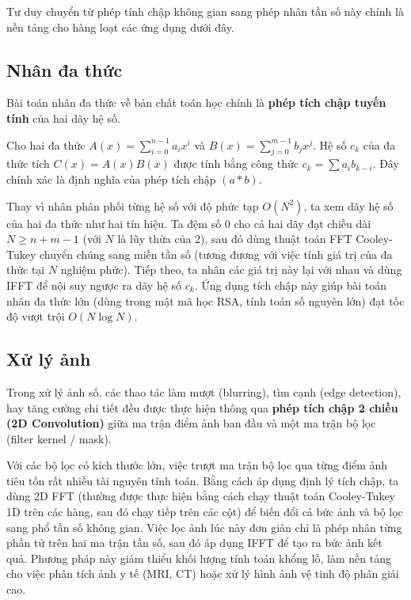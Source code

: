 Tư duy chuyển từ phép tính chập không gian sang phép nhân tần số này chính là nền tảng cho hàng loạt các ứng dụng dưới đây.

\subsection{Nhân đa thức}

Bài toán nhân đa thức về bản chất toán học chính là \textbf{phép tích chập tuyến tính} của hai dãy hệ số. 

Cho hai đa thức $A(x) = \sum_{i=0}^{n-1} a_i x^i$ và $B(x) = \sum_{j=0}^{m-1} b_j x^j$. Hệ số $c_k$ của đa thức tích $C(x) = A(x)B(x)$ được tính bằng công thức $c_k = \sum a_i b_{k-i}$. Đây chính xác là định nghĩa của phép tích chập $(a * b)$.

Thay vì nhân phân phối từng hệ số với độ phức tạp $O(N^2)$, ta xem dãy hệ số của hai đa thức như hai tín hiệu. Ta đệm số 0 cho cả hai dãy đạt chiều dài $N \ge n+m-1$ (với $N$ là lũy thừa của 2), sau đó dùng thuật toán FFT Cooley-Tukey chuyển chúng sang miền tần số (tương đương với việc tính giá trị của đa thức tại $N$ nghiệm phức). Tiếp theo, ta nhân các giá trị này lại với nhau và dùng IFFT để nội suy ngược ra dãy hệ số $c_k$. Ứng dụng tích chập này giúp bài toán nhân đa thức lớn (dùng trong mật mã học RSA, tính toán số nguyên lớn) đạt tốc độ vượt trội $O(N \log N)$.

\subsection{Xử lý ảnh}

Trong xử lý ảnh số, các thao tác làm mượt (blurring), tìm cạnh (edge detection), hay tăng cường chi tiết đều được thực hiện thông qua \textbf{phép tích chập 2 chiều (2D Convolution)} giữa ma trận điểm ảnh ban đầu và một ma trận bộ lọc (filter kernel / mask).

Với các bộ lọc có kích thước lớn, việc trượt ma trận bộ lọc qua từng điểm ảnh tiêu tốn rất nhiều tài nguyên tính toán. Bằng cách áp dụng định lý tích chập, ta dùng 2D FFT (thường được thực hiện bằng cách chạy thuật toán Cooley-Tukey 1D trên các hàng, sau đó chạy tiếp trên các cột) để biến đổi cả bức ảnh và bộ lọc sang phổ tần số không gian. Việc lọc ảnh lúc này đơn giản chỉ là phép nhân từng phần tử trên hai ma trận tần số, sau đó áp dụng IFFT để tạo ra bức ảnh kết quả. Phương pháp này giảm thiểu khối lượng tính toán khổng lồ, làm nền tảng cho việc phân tích ảnh y tế (MRI, CT) hoặc xử lý hình ảnh vệ tinh độ phân giải cao.

